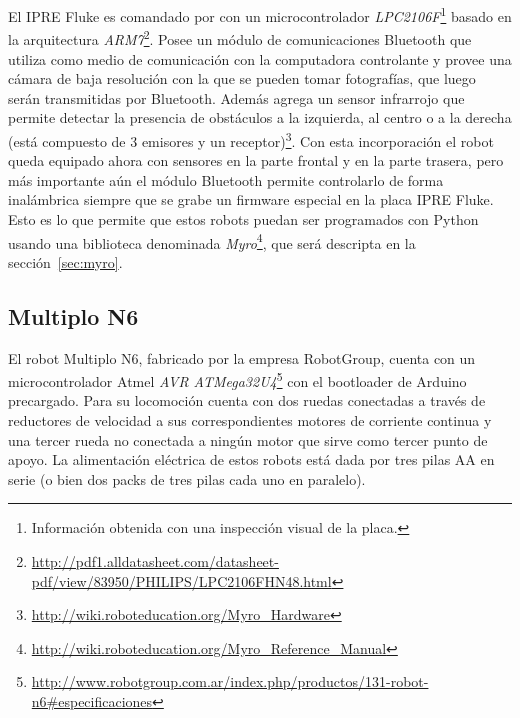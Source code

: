 El IPRE Fluke es comandado por con un microcontrolador
\textit{LPC2106F}\footnote{Información obtenida con una inspección visual
de la placa.}
basado en la arquitectura
\textit{ARM7}\footnote{\url{http://pdf1.alldatasheet.com/datasheet-pdf/view/83950/PHILIPS/LPC2106FHN48.html}}. Posee un módulo de comunicaciones
Bluetooth que utiliza como medio de comunicación con la computadora
controlante y
provee una cámara de baja resolución con la que se pueden tomar fotografías,
que luego serán transmitidas por Bluetooth. Además agrega
un sensor infrarrojo que permite detectar la presencia de obstáculos
a la izquierda, al centro o a la derecha (está compuesto de 3 emisores
y un
receptor)\footnote{\url{http://wiki.roboteducation.org/Myro_Hardware}}.
Con esta incorporación el robot queda equipado ahora con sensores
en la parte frontal y en la parte trasera, pero más importante aún
el módulo Bluetooth permite controlarlo de forma inalámbrica siempre
que se grabe un firmware especial en la placa IPRE Fluke. Esto es lo que permite
que estos robots puedan ser programados con Python usando una biblioteca denominada
\textit{Myro}\footnote{\url{http://wiki.roboteducation.org/Myro_Reference_Manual}},
que será descripta en la sección~\ref{sec:myro}.

\subsection{Multiplo N6}
El robot Multiplo N6, fabricado por la empresa RobotGroup, cuenta con un
microcontrolador Atmel
\textit{AVR ATMega32U4}\footnote{\url{http://www.robotgroup.com.ar/index.php/productos/131-robot-n6\#especificaciones}}
con el bootloader de Arduino
precargado. Para su locomoción cuenta con dos ruedas conectadas a través
de reductores de velocidad a sus correspondientes motores de
corriente continua y una tercer
rueda no conectada a ningún motor que sirve como tercer punto de apoyo.
La alimentación eléctrica de estos robots está dada por tres pilas AA
en serie (o bien dos packs de tres pilas cada uno en paralelo).

